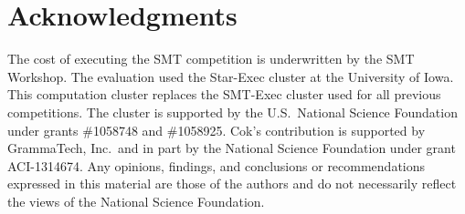 \documentclass{eptcs}
\begin{document}
\section*{Acknowledgments} 
 
The cost of executing the SMT competition is underwritten by the SMT
Workshop.  The evaluation used the Star-Exec cluster at the University
of Iowa.  This computation cluster replaces the SMT-Exec cluster used
for all previous competitions.  The cluster is supported by the
U.S.\ National Science Foundation under grants \#1058748 and \#1058925.  Cok's
contribution is supported by GrammaTech, Inc.\ and in part by the
National Science Foundation under grant ACI-1314674.  Any opinions,
findings, and conclusions or recommendations expressed in this
material are those of the authors and do not necessarily reflect the
views of the National Science Foundation.
 


\end{document}
